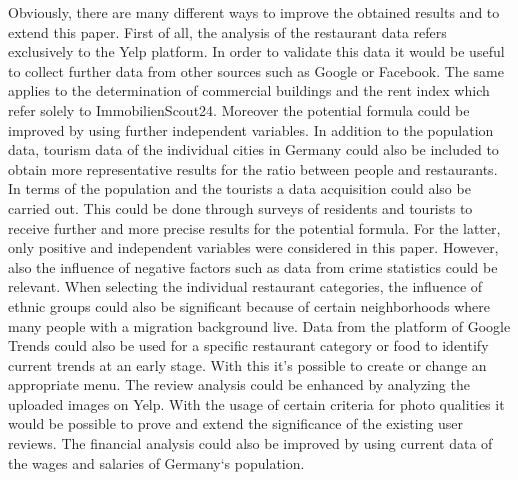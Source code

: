 Obviously, there are many different ways to improve the obtained results and to extend this paper. First of all, the analysis of the restaurant data refers exclusively to the Yelp platform. In order to validate this data it would be useful to collect further data from other sources such as Google or Facebook. The same applies to the determination of commercial buildings and the rent index which refer solely to ImmobilienScout24. \newline
Moreover the potential formula could be improved by using further independent variables. In addition to the population data, tourism data of the individual cities in Germany could also be included to obtain more representative results for the ratio between people and restaurants. In terms of the population and the tourists a data acquisition could also be carried out. This could be done through surveys of residents and tourists to receive further and more precise results for the potential formula. For the latter, only positive and independent variables were considered in this paper. However, also the influence of negative factors such as data from crime statistics could be relevant. \newline
When selecting the individual restaurant categories, the influence of ethnic groups could also be significant because of certain neighborhoods where many people with a migration background live. Data from the platform of Google Trends could also be used for a specific restaurant category or food to identify current trends at an early stage. With this it's possible to create or change an appropriate menu. \newline
The review analysis could be enhanced by analyzing the uploaded images on Yelp. With the usage of certain criteria for photo qualities it would be possible to prove and extend the significance of the existing user reviews. The financial analysis could also be improved by using current data of the wages and salaries of Germany‘s population.




